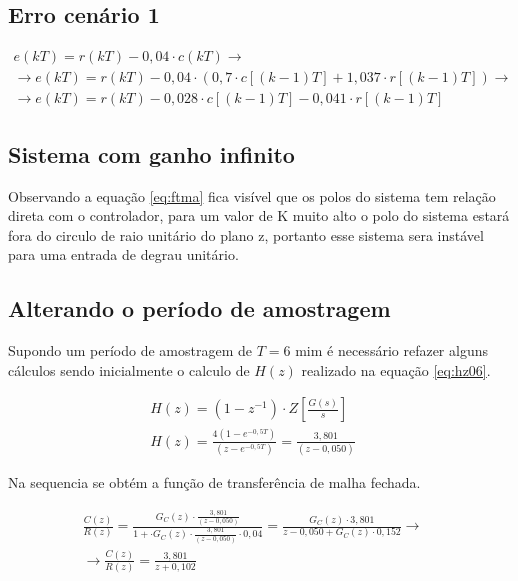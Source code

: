 \documentclass[a4paper,12pt]{article}
\begin{document}
			
		\subsection{Erro cenário 1}
			
			\begin{equation}
				\left.
				\begin{array}{c}
					\displaystyle e(kT) = r(kT) - 0,04 \cdot c(kT) \rightarrow \\[20pt]
					\displaystyle \rightarrow e(kT) = r(kT) - 0,04 \cdot (0,7\cdot c[(k-1)T] + 1,037 \cdot r[(k-1)T]) \rightarrow \\[20pt]
					\displaystyle \rightarrow e(kT) = r(kT) - 0,028 \cdot c[(k-1)T] - 0,041\cdot r[(k-1)T]
				\end{array}
				\right.
				\quad 
			\end{equation}
			
		\subsection{Sistema com ganho infinito}
			Observando a equação \ref{eq:ftma} fica visível que os polos do sistema tem relação direta com o controlador, para um valor de K muito alto o polo do sistema estará fora do circulo de raio unitário do plano z, portanto esse sistema sera instável para uma entrada de degrau unitário.
			
		\subsection{Alterando o período de amostragem}
			Supondo um período de amostragem de $T=6$ mim é necessário refazer alguns cálculos sendo inicialmente o calculo de $H(z)$ realizado na equação \ref{eq:hz06}.
			
			\begin{equation}
			\left.
			\begin{array}{c}
				\displaystyle H(z) = (1 - z^{-1}) \cdot Z\left[\frac{G(s)}{s}\right] \\[20pt]
				
				\displaystyle H(z)  = \frac{4(1 - e^{-0,5T})}{(z-e^{-0,5T})} = \frac{3,801}{(z-0,050)}
			\end{array}
			\right.
			\quad 
		\end{equation}
		
		Na sequencia se obtém a função de transferência de malha fechada.
		
		\begin{equation}
			\left.
			\begin{array}{c}
				\displaystyle \frac{C(z)}{R(z)} = \frac{G_C(z) \cdot \displaystyle \frac{3,801}{(z-0,050)}}{1 + \cdot G_C(z) \cdot \displaystyle \frac{3,801}{(z-0,050)} \cdot 0,04} = \frac{G_C(z) \cdot 3,801}{z - 0,050 + G_C(z) \cdot 0,152} \rightarrow \\[30pt]
				
				\displaystyle \rightarrow \frac{C(z)}{R(z)} = \frac{3,801}{z + 0,102}
			\end{array}
			\right.
			\quad 
			\label{eq:ftma}
		\end{equation}
		
\end{document}
